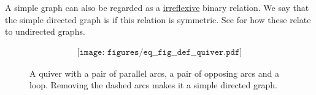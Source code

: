 \begin{definition}
\begin{thmenum}
    A simple graph can also be regarded as a \hyperref[def:binary_relation/irreflexive]{irreflexive} binary relation. We say that the simple directed graph is  if this relation is symmetric. See  for how these relate to undirected graphs.
  \end{thmenum}

  \begin{figure}
    \begin{equation}\label{eq:fig:def:quiver}
      \begin{aligned}
        \texttt{[image: figures/eq\_\_fig\_\_def\_\_quiver.pdf]}
      \end{aligned}
    \end{equation}
    \caption{A quiver with a pair of parallel arcs, a pair of opposing arcs and a loop. Removing the dashed arcs makes it a simple directed graph.}\label{fig:def:quiver}
  \end{figure}
\end{definition}

